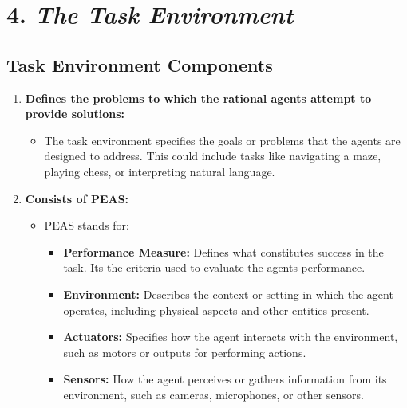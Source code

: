 \documentclass[
]{article}
\begin{document}
\section{\texorpdfstring{4. \emph{The Task
Environment}}{4. The Task Environment}}\label{4-the-task-environment}

\subsection{Task Environment
Components}\label{task-environment-components}

\begin{enumerate}
\def\labelenumi{\arabic{enumi}.}
\item
  \textbf{Defines the problems to which the rational agents attempt to
  provide solutions:}

  \begin{itemize}
  \item
    The task environment specifies the goals or problems that the agents
    are designed to address. This could include tasks like navigating a
    maze, playing chess, or interpreting natural language.
  \end{itemize}
\item
  \textbf{Consists of PEAS:}

  \begin{itemize}
  \item
    PEAS stands for:

    \begin{itemize}
    \item
      \textbf{Performance Measure:} Defines what constitutes success in
      the task. It\textquotesingle s the criteria used to evaluate the
      agent\textquotesingle s performance.
    \item
      \textbf{Environment:} Describes the context or setting in which
      the agent operates, including physical aspects and other entities
      present.
    \item
      \textbf{Actuators:} Specifies how the agent interacts with the
      environment, such as motors or outputs for performing actions.
    \item
      \textbf{Sensors:} How the agent perceives or gathers information
      from its environment, such as cameras, microphones, or other
      sensors.
    \end{itemize}
  \end{itemize}
\end{enumerate}
\end{document}
